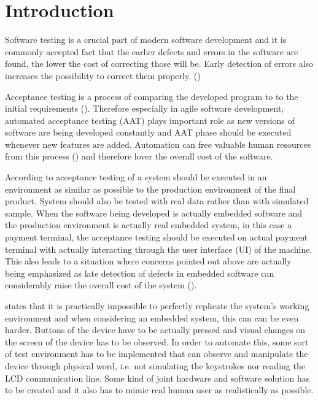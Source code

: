 
\chapter{Introduction}
\label{chapter:intro}

Software testing is a crucial part of modern software development and it is commonly accepted fact that the earlier defects and errors in the software are found, the lower the cost of correcting those will be. Early detection of errors also increases the possibility to correct them properly. (\emph{\cite{myers2011art}})

Acceptance testing is a process of comparing the developed program to to the initial requirements (\emph{\cite{myers2011art}}). Therefore especially in agile software development, automated acceptance testing (AAT) plays important role as new versions of software are being developed constantly and AAT phase should be executed whenever new features are added. Automation can free valuable human resources from this process (\emph{\cite{haugset2008automated}}) and therefore lover the overall cost of the software.

According to \emph{\cite{sommerville2011software}} acceptance testing of a system should be executed in an environment as similar as possible to the production environment of the final product. System should also be tested with real data rather than with simulated sample. When the software being developed is actually embedded software and the production environment is actually real embedded system, in this case a payment terminal, the acceptance testing should be executed on actual payment terminal with actually interacting through the user interface (UI) of the machine. This also leads to a situation where concerns pointed out above are actually being emphasized as late detection of defects in embedded software can considerably raise the overall cost of the system (\emph{\cite{ebert2009embedded}}).

\emph{\cite{sommerville2011software}} states that it is practically impossible to perfectly replicate the system's working environment and when considering an embedded system, this can can be even harder. Buttons of the device have to be actually pressed and visual changes on the screen of the device has to be observed. In order to automate this, some sort of test environment has to be implemented that can observe and manipulate the device through physical word, i.e. not simulating the keystrokes nor reading the LCD communication line. Some kind of joint hardware and software solution has to be created and it also has to mimic real human user as realistically as possible.

